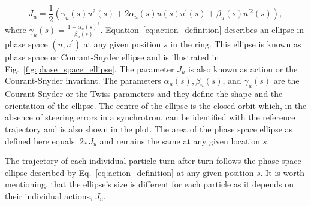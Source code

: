 \begin{equation}\label{eq:action_definition}
    J_u = \frac{1}{2} (\gamma_u(s) u^2(s) + 2 \alpha_u(s) u(s) u^\prime(s) + \beta_u(s) u^{\prime 2}(s)),
\end{equation}
where $\gamma_u(s)=\frac{1+\alpha_u(s)^2}{\beta_u(s)}$. Equation~\eqref{eq:action_definition} describes an ellipse in phase space $(u, u^\prime)$ at any given position $s$ in the ring. This ellipse is known as phase space or Courant-Snyder ellipse and is illustrated in Fig.~\ref{fig:phase_space_ellipse}. The parameter $J_u$ is also known as action or the Courant-Snyder invariant. The parameters $\alpha_u(s), \beta_u(s)$, and $\gamma_u(s)$ are the Courant-Snyder or the Twiss parameters and they define the shape and the orientation of the ellipse. The centre of the ellipse is the closed orbit which, in the absence of steering errors in a synchrotron, can be identified with the reference trajectory and is also shown in the plot. The area of the phase space ellipse as defined here equals: $2\pi J_u$ and remains the same at any given location $s$.

The trajectory of each individual particle turn after turn follows the phase space ellipse described by Eq.~\eqref{eq:action_definition} at any given position $s$. It is worth mentioning, that the ellipse's size is different for each particle as it depends on their individual actions, $J_u$.%


